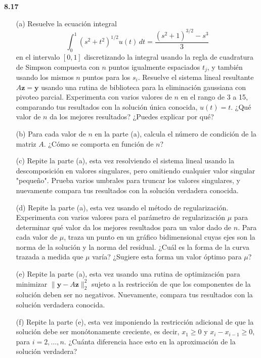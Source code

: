 \documentclass{article}
\begin{document}
\textbf{8.17}
\begin{itemize}
    \item[(a)] Resuelve la ecuación integral
    \[
    \int_0^1 (s^2 + t^2)^{1/2} u(t) \, dt = \frac{(s^2 + 1)^{3/2} - s^3}{3}
    \]
    en el intervalo \([0, 1]\) discretizando la integral usando la regla de cuadratura de Simpson compuesta con \(n\) puntos igualmente espaciados \(t_j\), y también usando los mismos \(n\) puntos para los \(s_i\). Resuelve el sistema lineal resultante \(A\mathbf{z} = \mathbf{y}\) usando una rutina de biblioteca para la eliminación gaussiana con pivoteo parcial. Experimenta con varios valores de \(n\) en el rango de 3 a 15, comparando tus resultados con la solución única conocida, \(u(t) = t\). ¿Qué valor de \(n\) da los mejores resultados? ¿Puedes explicar por qué?
    
    \item[(b)] Para cada valor de \(n\) en la parte (a), calcula el número de condición de la matriz \(A\). ¿Cómo se comporta en función de \(n\)?
    
    \item[(c)] Repite la parte (a), esta vez resolviendo el sistema lineal usando la descomposición en valores singulares, pero omitiendo cualquier valor singular "pequeño". Prueba varios umbrales para truncar los valores singulares, y nuevamente compara tus resultados con la solución verdadera conocida.
    
    \item[(d)] Repite la parte (a), esta vez usando el método de regularización. Experimenta con varios valores para el parámetro de regularización \(\mu\) para determinar qué valor da los mejores resultados para un valor dado de \(n\). Para cada valor de \(\mu\), traza un punto en un gráfico bidimensional cuyas ejes son la norma de la solución y la norma del residual. ¿Cuál es la forma de la curva trazada a medida que \(\mu\) varía? ¿Sugiere esta forma un valor óptimo para \(\mu\)?
    
    \item[(e)] Repite la parte (a), esta vez usando una rutina de optimización para minimizar \(\|\mathbf{y} - A\mathbf{z}\|_2^2\) sujeto a la restricción de que los componentes de la solución deben ser no negativos. Nuevamente, compara tus resultados con la solución verdadera conocida.
    \item[(f)] Repite la parte (e), esta vez imponiendo la restricción adicional de que la solución debe ser monótonamente creciente, es decir, \(x_1 \geq 0\) y \(x_i - x_{i-1} \geq 0\), para \(i = 2, \dots, n\). ¿Cuánta diferencia hace esto en la aproximación de la solución verdadera?
\end{itemize}
\end{document}
